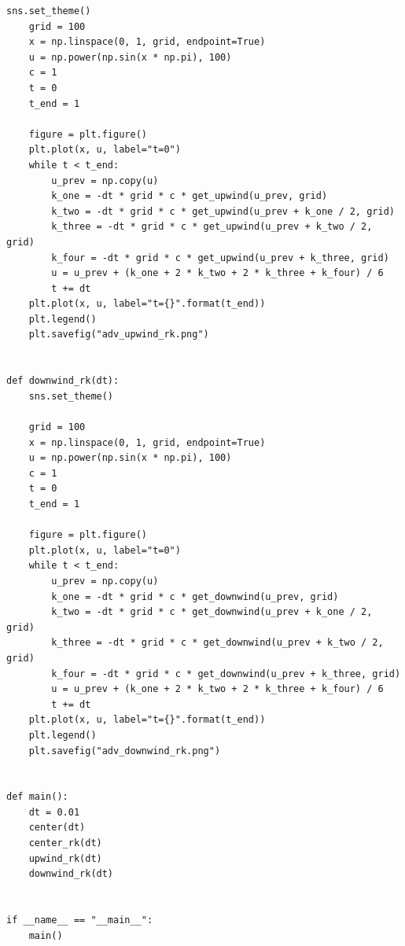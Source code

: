\documentclass{jsarticle}
\begin{document}
\begin{lstlisting}[caption=線形移流方程式,label=参照ラベル]
    sns.set_theme()
    grid = 100
    x = np.linspace(0, 1, grid, endpoint=True)
    u = np.power(np.sin(x * np.pi), 100)
    c = 1
    t = 0
    t_end = 1

    figure = plt.figure()
    plt.plot(x, u, label="t=0")
    while t < t_end:
        u_prev = np.copy(u)
        k_one = -dt * grid * c * get_upwind(u_prev, grid)
        k_two = -dt * grid * c * get_upwind(u_prev + k_one / 2, grid)
        k_three = -dt * grid * c * get_upwind(u_prev + k_two / 2, grid)
        k_four = -dt * grid * c * get_upwind(u_prev + k_three, grid)
        u = u_prev + (k_one + 2 * k_two + 2 * k_three + k_four) / 6
        t += dt
    plt.plot(x, u, label="t={}".format(t_end))
    plt.legend()
    plt.savefig("adv_upwind_rk.png")


def downwind_rk(dt):
    sns.set_theme()

    grid = 100
    x = np.linspace(0, 1, grid, endpoint=True)
    u = np.power(np.sin(x * np.pi), 100)
    c = 1
    t = 0
    t_end = 1

    figure = plt.figure()
    plt.plot(x, u, label="t=0")
    while t < t_end:
        u_prev = np.copy(u)
        k_one = -dt * grid * c * get_downwind(u_prev, grid)
        k_two = -dt * grid * c * get_downwind(u_prev + k_one / 2, grid)
        k_three = -dt * grid * c * get_downwind(u_prev + k_two / 2, grid)
        k_four = -dt * grid * c * get_downwind(u_prev + k_three, grid)
        u = u_prev + (k_one + 2 * k_two + 2 * k_three + k_four) / 6
        t += dt
    plt.plot(x, u, label="t={}".format(t_end))
    plt.legend()
    plt.savefig("adv_downwind_rk.png")


def main():
    dt = 0.01
    center(dt)
    center_rk(dt)
    upwind_rk(dt)
    downwind_rk(dt)


if __name__ == "__main__":
    main()
\end{lstlisting}
\end{document}
